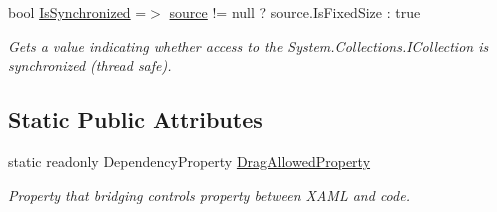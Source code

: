 \begin{DoxyCompactItemize}
bool \mbox{\hyperlink{class_wpf_handler_1_1_u_i_1_1_controls_1_1_collection_control_a0a40907daa815eb6c01be8677eb09450}{Is\+Synchronized}} =$>$ \mbox{\hyperlink{class_wpf_handler_1_1_u_i_1_1_controls_1_1_collection_control_a78ccfdc5208ab2306308d7356757f32f}{source}} != null ? source.\+Is\+Fixed\+Size \+: true
\begin{DoxyCompactList}\small\item\em Gets a value indicating whether access to the System.\+Collections.\+I\+Collection is synchronized (thread safe). \end{DoxyCompactList}\end{DoxyCompactItemize}
\subsection*{Static Public Attributes}
\begin{DoxyCompactItemize}
\item 
static readonly Dependency\+Property \mbox{\hyperlink{class_wpf_handler_1_1_u_i_1_1_controls_1_1_collection_control_aea4afe7ae229937f9c99809d720d8875}{Drag\+Allowed\+Property}}
\begin{DoxyCompactList}\small\item\em Property that bridging control\textquotesingle{}s property between X\+A\+ML and code. \end{DoxyCompactList}\end{DoxyCompactItemize}
